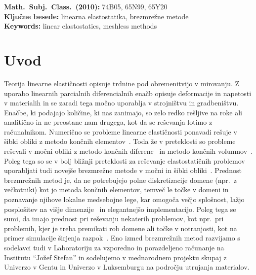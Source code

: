 \documentclass[12pt,a4paper,twoside]{article}
\theoremstyle{definition} %
\theoremstyle{plain} %
\numberwithin{equation}{section}
\let\oldsection\section
\def\section{\cleardoublepage\oldsection}
\begin{document}
\vfill\noindent
\textbf{Math.~Subj.~Class.~(2010):} 74B05, 65N99, 65Y20 \\[1mm]
\textbf{Ključne besede:} linearna elastostatika, brezmrežne metode \\[1mm]
\textbf{Keywords:} linear elastostatics, meshless methods


\cleardoublepage

\setcounter{page}{1}

\section{Uvod}

Teorija linearne elastičnosti opisuje trdnine pod obremenitvijo v mirovanju. Z uporabo linearnih
parcialnih diferencialnih enačb opisuje deformacije in napetosti v materialih in se zaradi tega
močno uporablja v strojništvu in gradbeništvu. Enačbe, ki podajajo količine, ki nas zanimajo,
so zelo redko rešljive na roke ali analitično in ne preostane nam drugega, kot da se reševanja
lotimo z računalnikom. Numerično se probleme linearne elastičnosti ponavadi rešuje v šibki obliki z
metodo končnih elementov~\cite{uienkiewicz2000finite}. Toda že v preteklosti so probleme reševali v
močni obliki z metodo končnih diferenc~\cite{hattel1995control} in metodo končnih
volumnov~\cite{stone2003dynamic}. Poleg tega so se v bolj bližnji preteklosti za reševanje
elastostatičnih problemov uporabljati tudi novejše brezmrežne metode v močni in šibki
obliki~\cite{chen2006meshless,mavric2015local}. Prednost brezmrežnih metod je, da ne potrebujejo
polne diskretizacije domene (npr.~z večkotniki) kot jo metoda končnih elementov, temveč le točke v
domeni in poznavanje njihove lokalne medsebojne lege, kar omogoča večjo splošnost, lažjo posplošitev
na višje dimenzije~\cite{dehghan2014numerical,li2013localized} in elegantnejšo implementacijo. Poleg
tega se sumi, da imajo prednost pri reševanju nekaterih problemov, kot npr.~pri problemih, kjer je
treba premikati rob domene ali točke v notranjosti, kot na primer simulacije širjenja
razpok~\cite{rao2000efficient}. Eno izmed brezmrežnih metod razvijamo s sodelavci  tudi v
Laboratoriju za vzporedno in porazdeljeno računanje na Institutu ``Jožef Stefan'' in sodelujemo v
mednarodnem projektu skupaj z Univerzo v Gentu in Univerzo v Luksemburgu na področju utrujanja
materialov.
\end{document}
